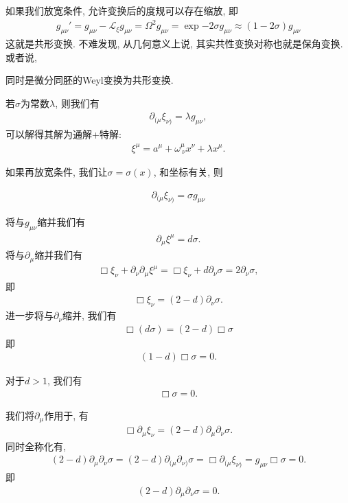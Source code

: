 如果我们放宽条件, 允许变换后的度规可以存在缩放, 即
\begin{align}
    g_{\mu\nu}'=g_{\mu\nu}-\mathscr L_\xi g_{\mu\nu}=\Omega^2 g_{\mu\nu}=\exp{-2\sigma}g_{\mu\nu}\approx(1-2\sigma)g_{\mu\nu}
\end{align}
这就是共形变换. 不难发现, 从几何意义上说, 其实共性变换对称也就是保角变换. 或者说, 
\begin{definition}[共形变换]
    同时是微分同胚的Weyl变换为共形变换.
\end{definition}

若$\sigma$为常数$\lambda$, 则我们有
\begin{align}
    \partial_{(\mu}\xi_{\nu)}=\lambda g_{\mu\nu},
\end{align}
可以解得其解为通解+特解:
\begin{align}
    \xi^\mu=a^\mu+\omega^\mu_{~\nu}x^\nu+\lambda x^\mu.
\end{align}

如果再放宽条件, 我们让$\sigma=\sigma(x)$, 和坐标有关, 则
\begin{theorem}[共形Killing方程]
    \begin{align}
        \partial_{(\mu}\xi_{\nu)}=\sigma g_{\mu\nu}\label{sp-c-eq}
    \end{align}
\end{theorem}
将与$g_{\mu\nu}$缩并我们有
\begin{align}
    \partial_\mu\xi^\mu=d\sigma.\label{div-killing}
\end{align}
将与$\partial_\mu$缩并我们有
\begin{align}
    \Box\xi_\nu+\partial_\nu\partial_\mu\xi^\mu=\Box\xi_\nu+d\partial_\nu\sigma=2\partial_\nu\sigma,
\end{align}
即
\begin{align}
    \Box\xi_\nu=(2-d)\partial_\nu\sigma\label{sp-c-eq2}.
\end{align}
进一步将与$\partial_\nu$缩并, 我们有
\begin{align}
    \Box(d\sigma)=(2-d)\Box\sigma
\end{align}
即
\begin{align}
    (1-d)\Box\sigma=0.
\end{align}

对于$d>1$, 我们有
\begin{align}
    \Box\sigma=0.
\end{align}

我们将$\partial_\mu$作用于, 有
\begin{align}
    \Box\partial_\mu\xi_\nu=(2-d)\partial_\mu\partial_\nu\sigma.
\end{align}
同时全称化有, 
\begin{align}
    (2-d)\partial_\mu\partial_\nu\sigma=(2-d)\partial_{(\mu}\partial_{\nu)}\sigma=\Box\partial_{(\mu}\xi_{\nu)}=g_{\mu\nu}\Box\sigma=0.
\end{align}
即
\begin{align}
    (2-d)\partial_\mu\partial_\nu\sigma=0.
\end{align}

